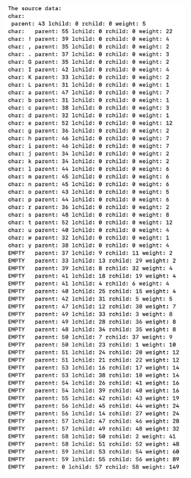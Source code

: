 \begin{enumerate}
\begin{figure}[htbp]
                    \includegraphics*[width = 8cm]{s3_4_0.png}

\end{figure}
\end{enumerate}
